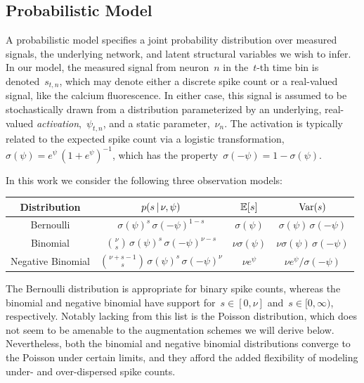 \subsection{Probabilistic Model}
A probabilistic model specifies a joint probability distribution over
measured signals, the underlying network, and latent structural
variables we wish to infer.  In our model, the measured signal from
neuron~$n$ in the~$t$-th time bin is denoted~$s_{t,n}$, which may 
denote either a discrete spike count or a real-valued signal, like 
the calcium fluorescence. In either case, this signal is assumed 
to be stochastically drawn from a distribution parameterized by 
an underlying, real-valued \emph{activation},~$\psi_{t,n}$,
and a static parameter,~$\nu_n$. The
activation is typically related to the expected spike count via
a logistic transformation,~$\sigma(\psi) = e^\psi \, (1+e^\psi)^{-1}$,
which has the property~$\sigma(-\psi) = 1-\sigma(\psi)$.

In this work we consider the following three observation models:
\begin{center}
\begin{tabular}{c|c|c|c}
  \textbf{Distribution} & $p(s \,|\, \nu, \psi)$ & $\mathbb{E}[s]$ & $\mathrm{Var}(s)$ \\
  \hline
  Bernoulli & $\sigma(\psi)^s \, \sigma(-\psi)^{1-s}$ & $\sigma(\psi)$ & $\sigma(\psi) \, \sigma(-\psi)$ \\
  \hline
  Binomial & ${\nu \choose s} \, \sigma(\psi)^s \, \sigma(-\psi)^{\nu-s}$ & $\nu \sigma(\psi)$ & $\nu \sigma(\psi) \, \sigma(-\psi)$ \\
  \hline
  Negative Binomial & ${\nu + s -1 \choose s} \, \sigma(\psi)^s \, \sigma(-\psi)^{\nu}$ & $\nu e^\psi$ & $\nu e^\psi / \sigma(-\psi)$ \\
\end{tabular}
\end{center}
The Bernoulli distribution is appropriate for binary spike counts,
whereas the binomial and negative binomial have support
for~$s\in[0,\nu]$ and~$s \in [0, \infty)$, respectively.
Notably lacking from this list is the Poisson distribution,
which does not seem to be amenable to the augmentation schemes
we will derive below. Nevertheless, both the binomial and negative
binomial distributions converge to the Poisson under certain
limits, and they afford the added flexibility of modeling under- and
over-dispersed spike counts. 

